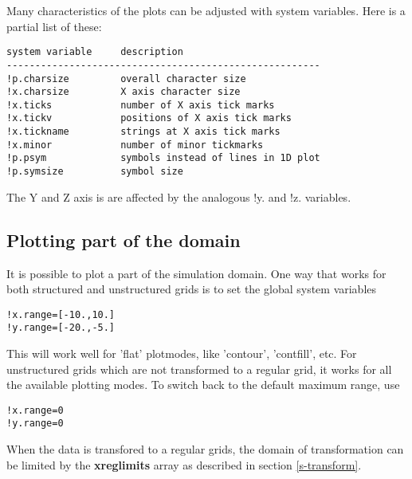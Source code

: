    Many characteristics of the plots can be adjusted with system variables.
   Here is a partial list of these:
\begin{verbatim}
system variable     description
-------------------------------------------------------
!p.charsize         overall character size
!x.charsize         X axis character size
!x.ticks            number of X axis tick marks
!x.tickv            positions of X axis tick marks
!x.tickname         strings at X axis tick marks
!x.minor            number of minor tickmarks
!p.psym             symbols instead of lines in 1D plot
!p.symsize          symbol size
\end{verbatim}
  The Y and Z axis is are affected by the analogous !y. and !z. variables.

\subsection{Plotting part of the domain \label{s-plot-part}}

   It is possible to plot a part of the simulation domain.
   One way that works for both structured and unstructured grids is
   to set the global system variables
\begin{verbatim}
!x.range=[-10.,10.]
!y.range=[-20.,-5.]
\end{verbatim}
   This will work well for 'flat' plotmodes, like 'contour',
   'contfill', etc. For unstructured grids which are not transformed
   to a regular grid, it works for all the available plotting modes.
   To switch back to the default maximum range, use
\begin{verbatim}
!x.range=0
!y.range=0
\end{verbatim}
   When the data is transfored to a regular grids, the domain of transformation
   can be limited by the {\bf xreglimits} array as described in section
   \ref{s-transform}. 

